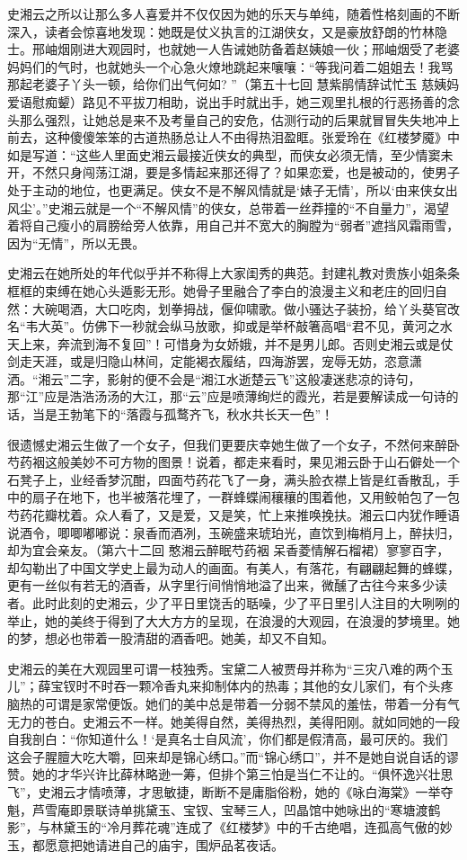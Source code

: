\documentclass[openany,scheme = chinese, linespread = 1.5]{ctexbook}
\begin{document}
史湘云之所以让那么多人喜爱并不仅仅因为她的乐天与单纯，随着性格刻画的不断深入，读者会惊喜地发现：她既是仗义执言的江湖侠女，又是豪放舒朗的竹林隐士。邢岫烟刚进大观园时，也就她一人告诫她防备着赵姨娘一伙；邢岫烟受了老婆妈妈们的气时，也就她头一个心急火燎地跳起来嚷嚷：“等我问着二姐姐去！我骂那起老婆子丫头一顿，给你们出气何如? ”（第五十七回 慧紫鹃情辞试忙玉 慈姨妈爱语慰痴颦）路见不平拔刀相助，说出手时就出手，她三观里扎根的行恶扬善的念头那么强烈，让她总是来不及考量自己的安危，估测行动的后果就冒冒失失地冲上前去，这种傻傻笨笨的古道热肠总让人不由得热泪盈眶。张爱玲在《红楼梦魇》中如是写道：“这些人里面史湘云最接近侠女的典型，而侠女必须无情，至少情窦未开，不然只身闯荡江湖，要是多情起来那还得了？如果恋爱，也是被动的，使男子处于主动的地位，也更满足。侠女不是不解风情就是‘婊子无情’，所以‘由来侠女出风尘’。”史湘云就是一个“不解风情”的侠女，总带着一丝莽撞的“不自量力”，渴望着将自己瘦小的肩膀给旁人依靠，用自己并不宽大的胸膛为“弱者”遮挡风霜雨雪，因为“无情”，所以无畏。

史湘云在她所处的年代似乎并不称得上大家闺秀的典范。封建礼教对贵族小姐条条框框的束缚在她心头遁影无形。她骨子里融合了李白的浪漫主义和老庄的回归自然：大碗喝酒，大口吃肉，划拳拇战，偃仰啸歌。做小骚达子装扮，给丫头葵官改名“韦大英”。仿佛下一秒就会纵马放歌，抑或是举杯敲箸高唱“君不见，黄河之水天上来，奔流到海不复回”！可惜身为女娇娥，并不是男儿郎。否则史湘云或是仗剑走天涯，或是归隐山林间，定能褐衣履结，四海游罢，宠辱无妨，恣意潇洒。“湘云”二字，影射的便不会是“湘江水逝楚云飞”这般凄迷悲凉的诗句，那“江”应是浩浩汤汤的大江，那“云”应是喷薄绚烂的霞光，若是要解读成一句诗的话，当是王勃笔下的“落霞与孤鹜齐飞，秋水共长天一色”！

很遗憾史湘云生做了一个女子，但我们更要庆幸她生做了一个女子，不然何来醉卧芍药裀这般美妙不可方物的图景！说着，都走来看时，果见湘云卧于山石僻处一个石凳子上，业经香梦沉酣，四面芍药花飞了一身，满头脸衣襟上皆是红香散乱，手中的扇子在地下，也半被落花埋了，一群蜂蝶闹穰穰的围着他，又用鲛帕包了一包芍药花瓣枕着。众人看了，又是爱，又是笑，忙上来推唤挽扶。湘云口内犹作睡语说酒令，唧唧嘟嘟说：泉香而酒冽，玉碗盛来琥珀光，直饮到梅梢月上，醉扶归，却为宜会亲友。（第六十二回 憨湘云醉眠芍药裀 呆香菱情解石榴裙）寥寥百字，却勾勒出了中国文学史上最为动人的画面。有美人，有落花，有翩翩起舞的蜂蝶，更有一丝似有若无的酒香，从字里行间悄悄地溢了出来，微醺了古往今来多少读者。此时此刻的史湘云，少了平日里饶舌的聒噪，少了平日里引人注目的大咧咧的举止，她的美终于得到了大大方方的呈现，在浪漫的大观园，在浪漫的梦境里。她的梦，想必也带着一股清甜的酒香吧。她美，却又不自知。

史湘云的美在大观园里可谓一枝独秀。宝黛二人被贾母并称为“三灾八难的两个玉儿”；薛宝钗时不时吞一颗冷香丸来抑制体内的热毒；其他的女儿家们，有个头疼脑热的可谓是家常便饭。她们的美中总是带着一分弱不禁风的羞怯，带着一分有气无力的苍白。史湘云不一样。她美得自然，美得热烈，美得阳刚。就如同她的一段自我剖白：“你知道什么！‘是真名士自风流’，你们都是假清高，最可厌的。我们这会子腥膻大吃大嚼，回来却是锦心绣口。”而“锦心绣口”，并不是她自说自话的谬赞。她的才华兴许比薛林略逊一筹，但排个第三怕是当仁不让的。“俱怀逸兴壮思飞”，史湘云才情喷薄，才思敏捷，断断不是庸脂俗粉，她的《咏白海棠》一举夺魁，芦雪庵即景联诗单挑黛玉、宝钗、宝琴三人，凹晶馆中她咏出的“寒塘渡鹤影”，与林黛玉的“冷月葬花魂”连成了《红楼梦》中的千古绝唱，连孤高气傲的妙玉，都愿意把她请进自己的庙宇，围炉品茗夜话。
\end{document}
